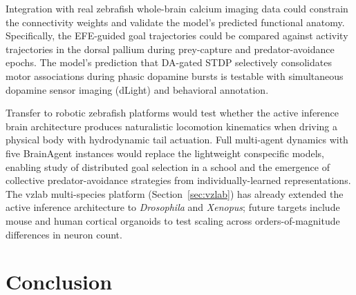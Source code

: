 \documentclass[12pt]{article}
\begin{document}
Integration with real zebrafish whole-brain calcium imaging data
\citep{ahrens2013,portugues2014} could constrain the connectivity
weights and validate the model's predicted functional anatomy.
Specifically, the EFE-guided goal trajectories could be compared
against activity trajectories in the dorsal pallium during
prey-capture and predator-avoidance epochs.
The model's prediction that DA-gated STDP selectively consolidates
motor associations during phasic dopamine bursts is testable with
simultaneous dopamine sensor imaging (dLight) and behavioral
annotation.

Transfer to robotic zebrafish platforms \citep{marques2018} would
test whether the active inference brain architecture produces
naturalistic locomotion kinematics when driving a physical body with
hydrodynamic tail actuation.
Full multi-agent dynamics with five BrainAgent instances would
replace the lightweight conspecific models, enabling study of
distributed goal selection in a school and the emergence of
collective predator-avoidance strategies from individually-learned
representations.
The vzlab multi-species platform (Section~\ref{sec:vzlab}) has already
extended the active inference architecture to \textit{Drosophila}
and \textit{Xenopus}; future targets include mouse and human
cortical organoids to test scaling across orders-of-magnitude
differences in neuron count.

\section{Conclusion}\label{sec:conclusion}
\end{document}
